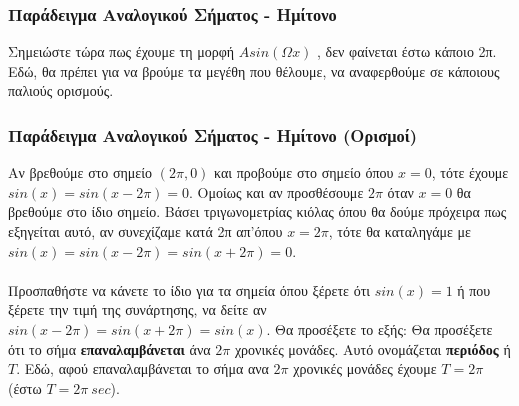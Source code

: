 \documentclass{beamer}
\begin{document}
	\begin{frame}
	\frametitle{Παράδειγμα Αναλογικού Σήματος - Ημίτονο}
	\begin{center}
	\end{center}
	Σημειώστε τώρα πως έχουμε τη μορφή $Asin(\Omega x)$ , δεν φαίνεται έστω κάποιο 2π. Εδώ, θα πρέπει για να βρούμε τα μεγέθη που θέλουμε, να αναφερθούμε σε κάποιους παλιούς ορισμούς.
\end{frame}
\begin{frame}
	\frametitle{Παράδειγμα Αναλογικού Σήματος - Ημίτονο (Ορισμοί)}
	Αν βρεθούμε στο σημείο $(2\pi,0)$ και προβούμε στο σημείο όπου $x=0$, τότε έχουμε $sin(x)=sin(x-2\pi)=0$. Ομοίως και αν προσθέσουμε $2\pi$ όταν $x=0$ θα βρεθούμε στο ίδιο σημείο. Βάσει τριγωνομετρίας κιόλας όπου θα δούμε πρόχειρα πως εξηγείται αυτό, αν συνεχίζαμε κατά 2π απ'όπου $x=2\pi$, τότε θα καταληγάμε με $sin(x)=sin(x-2\pi)=sin(x+2\pi)=0$. \pause
	\\~\\
	Προσπαθήστε να κάνετε το ίδιο για τα σημεία όπου ξέρετε ότι $sin(x) = 1$ ή που ξέρετε την τιμή της συνάρτησης, να δείτε αν $sin(x-2\pi) = sin(x+2\pi) = sin(x)$. Θα προσέξετε το εξής: 	Θα προσέξετε ότι το σήμα \textbf{επαναλαμβάνεται} άνα $2\pi$ χρονικές μονάδες. Αυτό ονομάζεται \textbf{περιόδος} ή \textbf{$T$}. Εδώ, αφού επαναλαμβάνεται το σήμα ανα $2\pi$ χρονικές μονάδες έχουμε $T=2\pi$ (έστω $T=2\pi ~sec$).
\end{frame}
\end{document}

